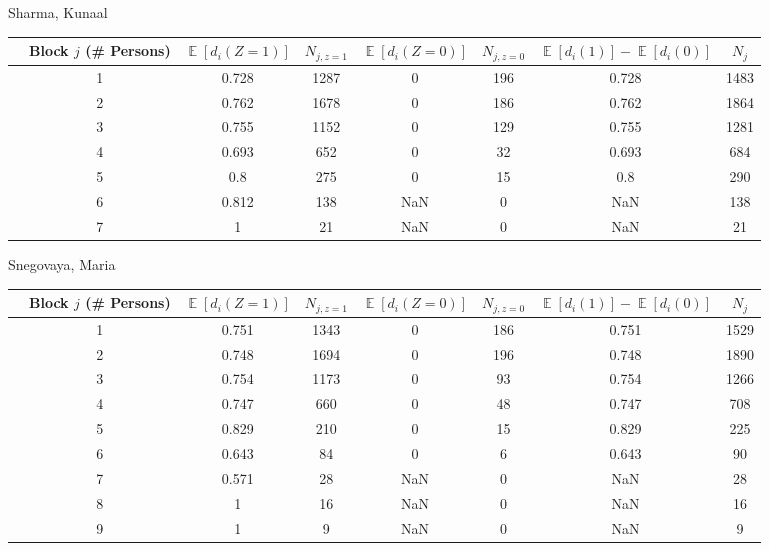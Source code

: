 \documentclass[11pt,notitlepage]{article}
\def\E{\mathop{\mathbb{E}}}
\begin{document}
Sharma, Kunaal
\begin{table}[h!]\small
\begin{center}
\begin{tabular}{rc|cc|cc|cc}
  \hline
 & Block $j$ (\# Persons) & $\E[d_i(Z=1)]$ & $N_{j, z=1}$ & $\E[d_i(Z=0)]$ & $N_{j, z=0}$ & $\E[d_i(1)]-\E[d_i(0)]$ & $N_j$ \\ 
  \hline
  & 1 & 0.728 & 1287 & 0 & 196 & 0.728 & 1483 \\ 
  & 2 & 0.762 & 1678 & 0 & 186 & 0.762 & 1864 \\ 
  & 3 & 0.755 & 1152 & 0 & 129 & 0.755 & 1281 \\ 
  & 4 & 0.693 & 652 & 0 & 32 & 0.693 & 684 \\ 
  & 5 & 0.8 & 275 & 0 & 15 & 0.8 & 290 \\ 
  & 6 & 0.812 & 138 & NaN & 0 & NaN & 138 \\ 
  & 7 & 1 & 21 & NaN & 0 & NaN & 21 \\ 
   \hline
\end{tabular}
\end{center}
\end{table}


Snegovaya, Maria
\begin{table}[h!]\small
\begin{center}
\begin{tabular}{rc|cc|cc|cc}
  \hline
 & Block $j$ (\# Persons) & $\E[d_i(Z=1)]$ & $N_{j, z=1}$ & $\E[d_i(Z=0)]$ & $N_{j, z=0}$ & $\E[d_i(1)]-\E[d_i(0)]$ & $N_j$ \\ 
  \hline
 & 1 & 0.751 & 1343 & 0 & 186 & 0.751 & 1529 \\ 
 & 2 & 0.748 & 1694 & 0 & 196 & 0.748 & 1890 \\ 
 & 3 & 0.754 & 1173 & 0 & 93 & 0.754 & 1266 \\ 
 & 4 & 0.747 & 660 & 0 & 48 & 0.747 & 708 \\ 
 & 5 & 0.829 & 210 & 0 & 15 & 0.829 & 225 \\ 
 & 6 & 0.643 & 84 & 0 & 6 & 0.643 & 90 \\ 
 & 7 & 0.571 & 28 & NaN & 0 & NaN & 28 \\ 
 & 8 & 1 & 16 & NaN & 0 & NaN & 16 \\ 
 & 9 & 1 & 9 & NaN & 0 & NaN & 9 \\ 
   \hline
\end{tabular}
\end{center}
\end{table}
\end{document}
